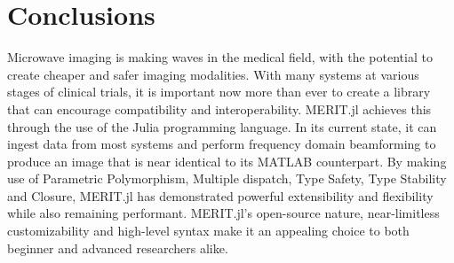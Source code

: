 \setcounter{chapter}{6}
\setcounter{section}{0}
\setcounter{subsection}{0}
\chapter*{Conclusions}
Microwave imaging is making waves in the medical field, with the potential to create cheaper and safer imaging
modalities. With many systems at various stages of clinical trials, it is important now more than ever to create a
library that can encourage compatibility and interoperability. MERIT.jl achieves this through the use of the Julia
programming language. In its current state, it can ingest data from most systems and perform frequency domain
beamforming to produce an image that is near identical to its MATLAB counterpart. By making use of Parametric
Polymorphism, Multiple dispatch, Type Safety, Type Stability and Closure, MERIT.jl has demonstrated powerful extensibility
and flexibility while also remaining performant. MERIT.jl's open-source nature, near-limitless customizability and
high-level syntax make it an appealing choice to both beginner and advanced researchers alike. 